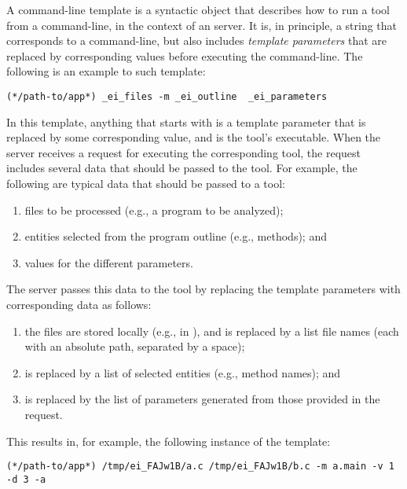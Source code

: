 A command-line template is a syntactic object that describes how to
run a tool from a command-line, in the context of an \ei server. It
is, in principle, a string that corresponds to a command-line, but
also includes \emph{template parameters} that are replaced by
corresponding values before executing the command-line.
%
The following is an example to such template:

\medskip
\begin{lstlisting}
(*/path-to/app*) _ei_files -m _ei_outline  _ei_parameters
\end{lstlisting}

\medskip
\noindent
In this template, anything that starts with  is
a template parameter that is replaced by some corresponding value, and
 is the tool's executable.
% 
When the server receives a request for executing the corresponding
tool, the request includes several data that should be passed to the
tool. For example, the following are typical data that should be
passed to a tool:
% 
\begin{enumerate}
\item files to be processed (e.g., a program to be analyzed);
\item entities selected from the program outline (e.g., methods); and
\item values for the different parameters.
\end{enumerate}
% 
The server passes this data to the tool by replacing the
template parameters with corresponding data as follows:
% 
\begin{enumerate}
\item the files are stored locally (e.g., in ), and
   is replaced by a list file names (each
  with an absolute path, separated by a space);
\item {} is replaced by a list of
  selected entities (e.g., method names); and
\item {} is replaced by the list of
  parameters generated from those provided in the request.
\end{enumerate}
% 
This results in, for example, the following instance of the template:

\medskip
\begin{lstlisting}
(*/path-to/app*) /tmp/ei_FAJw1B/a.c /tmp/ei_FAJw1B/b.c -m a.main -v 1 -d 3 -a
\end{lstlisting}

